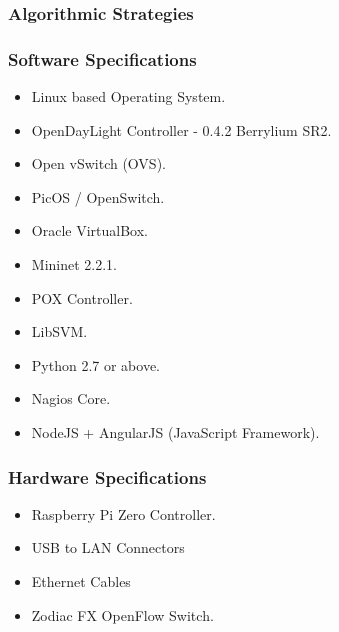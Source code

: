 \documentclass[10pt]{beamer}
\begin{document}
\begin{frame}
\frametitle{Algorithmic Strategies}
\end{frame}

	

\begin{frame}
\frametitle{Software Specifications}
\begin{itemize}
\footnotesize
\item
Linux based Operating System.
\item
OpenDayLight Controller - 0.4.2 Berrylium SR2.
\item
Open vSwitch (OVS).
\item
PicOS / OpenSwitch.
\item
Oracle VirtualBox.
\item
Mininet 2.2.1.
\item
POX Controller.
\item
LibSVM.
\item
Python 2.7 or above.
\item
Nagios Core.
\item
NodeJS + AngularJS (JavaScript Framework). 
\end{itemize}
\end{frame}

\begin{frame}
\frametitle{Hardware Specifications}
\begin{itemize}
\footnotesize
\item
Raspberry Pi Zero Controller.
\item
USB to LAN Connectors
\item
Ethernet Cables
\item
Zodiac FX OpenFlow Switch.
\end{itemize}
\end{frame}
\end{document}
